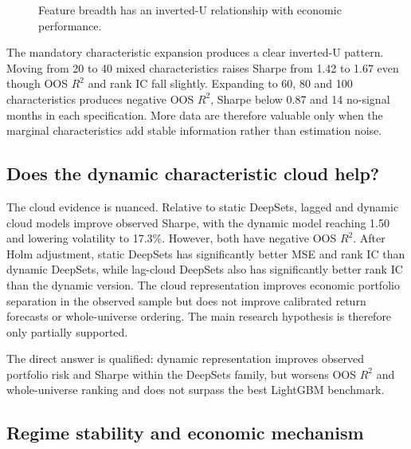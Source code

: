 \documentclass[11pt,a4paper]{article}
\begin{document}
\begin{figure}[ht]
\centering
{}
\caption{Feature breadth has an inverted-U relationship with economic performance.}
\label{fig:breadth}
\end{figure}

The mandatory characteristic expansion produces a clear inverted-U pattern. Moving from 20 to 40 mixed characteristics raises Sharpe from 1.42 to 1.67 even though OOS $R^2$ and rank IC fall slightly. Expanding to 60, 80 and 100 characteristics produces negative OOS $R^2$, Sharpe below 0.87 and 14 no-signal months in each specification. More data are therefore valuable only when the marginal characteristics add stable information rather than estimation noise.

\subsection*{Does the dynamic characteristic cloud help?}

The cloud evidence is nuanced. Relative to static DeepSets, lagged and dynamic cloud models improve observed Sharpe, with the dynamic model reaching 1.50 and lowering volatility to 17.3\%. However, both have negative OOS $R^2$. After Holm adjustment, static DeepSets has significantly better MSE and rank IC than dynamic DeepSets, while lag-cloud DeepSets also has significantly better rank IC than the dynamic version. The cloud representation improves economic portfolio separation in the observed sample but does not improve calibrated return forecasts or whole-universe ordering. The main research hypothesis is therefore only partially supported.

The direct answer is qualified: dynamic representation improves observed portfolio risk and Sharpe within the DeepSets family, but worsens OOS $R^2$ and whole-universe ranking and does not surpass the best LightGBM benchmark.

\subsection*{Regime stability and economic mechanism}
\end{document}
